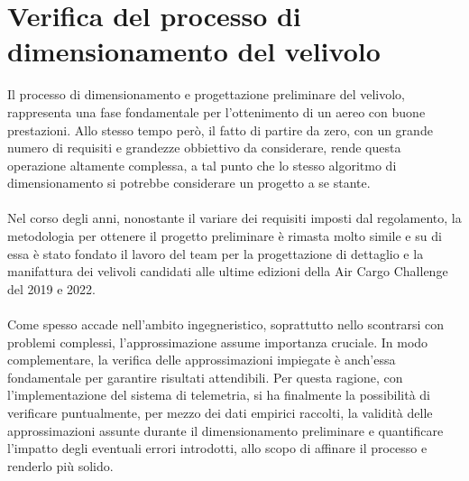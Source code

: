 \documentclass[12pt]{article}
\begin{document}
\section{Verifica del processo di dimensionamento del velivolo}
Il processo di dimensionamento e progettazione preliminare del velivolo, rappresenta una fase fondamentale per l'ottenimento di un aereo con buone prestazioni. Allo stesso tempo però, il fatto di partire da zero, con un grande numero di requisiti e grandezze obbiettivo da considerare, rende questa operazione altamente complessa, a tal punto che lo stesso algoritmo di dimensionamento si potrebbe considerare un progetto a se stante. 
\\\\
Nel corso degli anni, nonostante il variare dei requisiti imposti dal regolamento, la metodologia per ottenere il progetto preliminare è rimasta molto simile e su di essa è stato fondato il lavoro del team per la progettazione di dettaglio e la manifattura dei velivoli candidati alle ultime edizioni della Air Cargo Challenge del 2019 e 2022.
\\\\
Come spesso accade nell'ambito ingegneristico, soprattutto nello scontrarsi con problemi complessi, l'approssimazione assume importanza cruciale. In modo complementare, la verifica delle approssimazioni impiegate è anch'essa fondamentale per garantire risultati attendibili. Per questa ragione, con l'implementazione del sistema di telemetria, si ha finalmente la possibilità di verificare puntualmente, per mezzo dei dati empirici raccolti, la validità delle approssimazioni assunte durante il dimensionamento preliminare e quantificare l'impatto degli eventuali errori introdotti, allo scopo di affinare il processo e renderlo più solido.
\end{document}
